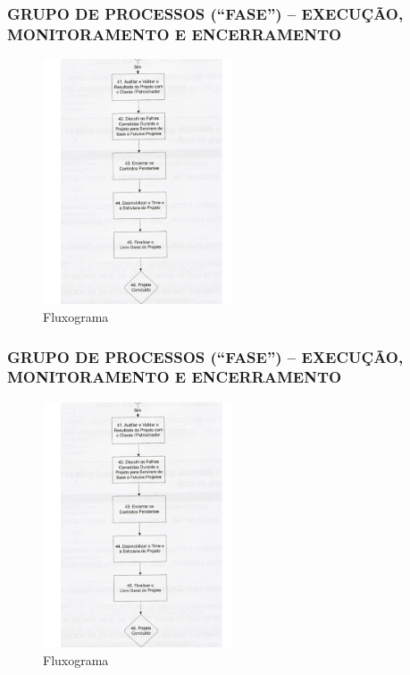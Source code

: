 \begin{frame}
 \frametitle{GRUPO DE PROCESSOS (“FASE”) – \small{EXECUÇÃO, MONITORAMENTO E ENCERRAMENTO}}
  \begin{figure}
   \centering
   \includegraphics[width = 0.5\textwidth]{figs/fig3.png}
   \caption{Fluxograma}
  \end{figure}
\end{frame}

\begin{frame}
 \frametitle{GRUPO DE PROCESSOS (“FASE”) – \small{EXECUÇÃO, MONITORAMENTO E ENCERRAMENTO}}
  \begin{figure}
   \centering
   \includegraphics[width = 0.5\textwidth]{figs/fig4.png}
   \caption{Fluxograma}
  \end{figure}
\end{frame}

